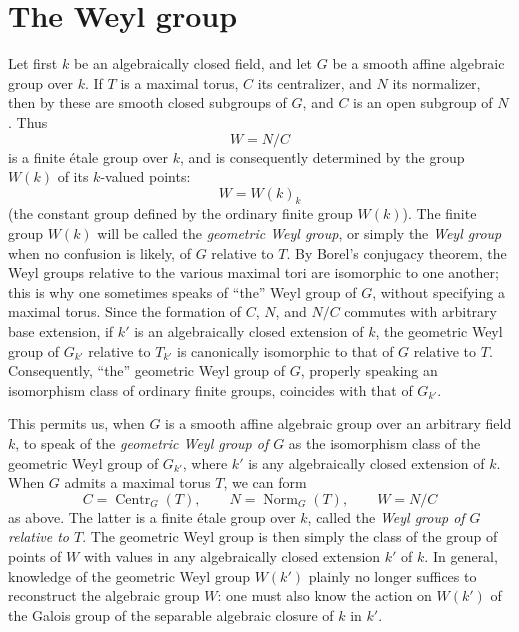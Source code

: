 \section{The Weyl group}

Let first \(k\) be an algebraically closed field, and let \(G\) be a
smooth affine algebraic group over \(k\). If \(T\) is a maximal torus,
\(C\) its centralizer, and \(N\) its normalizer, then by  these
are smooth closed subgroups of \(G\), and \(C\) is an open subgroup of
\(N\). Thus
\[
  W=N/C
\]
is a finite étale group over \(k\), and is consequently determined by
the group \(W(k)\) of its \(k\)-valued points:
\[
  W=W(k)_k
\]
(the constant group defined by the ordinary finite group \(W(k)\)).
The finite group \(W(k)\) will be called the \emph{geometric Weyl
group}, or simply the \emph{Weyl group} when no confusion is likely,
of \(G\) relative to \(T\). By Borel's conjugacy theorem, the Weyl
groups relative to the various maximal tori are isomorphic to one
another; this is why one sometimes speaks of ``the'' Weyl group of
\(G\), without specifying a maximal torus. Since the formation of
\(C\), \(N\), and \(N/C\) commutes with arbitrary base extension, if
\(k'\) is an algebraically closed extension of \(k\), the geometric
Weyl group of \(G_{k'}\) relative to \(T_{k'}\) is canonically
isomorphic to that of \(G\) relative to \(T\). Consequently, ``the''
geometric Weyl group of \(G\), properly speaking an isomorphism class
of ordinary finite groups, coincides with that of \(G_{k'}\).

This permits us, when \(G\) is a smooth affine algebraic group over an
arbitrary field \(k\), to speak of the \emph{geometric Weyl group of
\(G\)} as the isomorphism class of the geometric Weyl group of
\(G_{k'}\), where \(k'\) is any algebraically closed extension of
\(k\). When \(G\) admits a maximal torus \(T\), we can form
\[
  C=\operatorname{Centr}_G(T),\qquad
  N=\operatorname{Norm}_G(T),\qquad
  W=N/C
\]
as above. The latter is a finite étale group over \(k\), called the
\emph{Weyl group of \(G\) relative to \(T\)}. The geometric Weyl group
is then simply the class of the group of points of \(W\) with values
in any algebraically closed extension \(k'\) of \(k\). In general,
knowledge of the geometric Weyl group \(W(k')\) plainly no longer
suffices to reconstruct the algebraic group \(W\): one must also know
the action on \(W(k')\) of the Galois group of the separable algebraic
closure of \(k\) in \(k'\).

